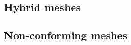 \documentclass[review]{siamart0216}
\theoremstyle{assumption}
\newcommand{\note}[1]{{\color{blue}{#1}}}
\begin{document}
\subsection{Hybrid meshes}

\subsection{Non-conforming meshes}


%
%
%



\end{document}
